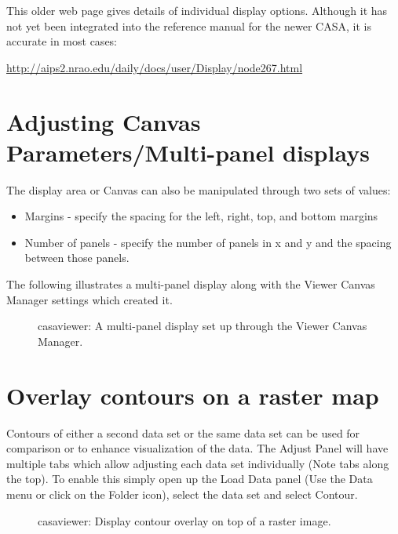 This older web page gives details of individual display options.
Although it has not yet been integrated into the reference manual for
the newer CASA, it is accurate in most cases: 

\url{http://aips2.nrao.edu/daily/docs/user/Display/node267.html}


\section{Adjusting Canvas Parameters/Multi-panel displays}
\label{section:viewer.canvas}

The display area or Canvas can also be manipulated through two sets of values:
\begin{itemize}
   \item Margins - specify the spacing for the left, right, top, and bottom margins
   \item Number of panels - specify the number of panels in x and y
         and the spacing between those panels. 
\end{itemize}

The following illustrates a multi-panel display along with the Viewer
Canvas Manager settings which created it. 

\begin{figure}[h]
\caption{\label{fig:viewer_canvas} casaviewer: A multi-panel display
set up through the Viewer Canvas Manager.} 
\hrulefill
\end{figure}
 

\section{Overlay contours on a raster map}
\label{section:viewer.contours-on-raster}

Contours of either a second data set or the same data set can be used
for comparison or to enhance visualization of the data. The Adjust
Panel will have multiple tabs which allow adjusting each data set
individually (Note tabs along the top). To enable this simply open up
the Load Data panel (Use the Data menu or click on the Folder icon),
select the data set and select Contour. 

\begin{figure}[h]
\caption{\label{fig:viewer_overlay} casaviewer: Display contour
overlay on top of a raster image.} 
\hrulefill
\end{figure}
 
